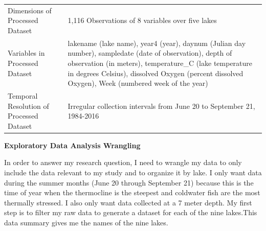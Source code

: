 \documentclass[12pt,]{article}
\begin{document}
\begin{longtable}[]{@{}ll@{}}
\begin{minipage}[t]{0.33\columnwidth}
Dimensions of Processed Dataset\strut
\end{minipage} & \begin{minipage}[t]{0.61\columnwidth}\raggedright\strut
1,116 Observations of 8 variables over five lakes\strut
\end{minipage}\tabularnewline
\begin{minipage}[t]{0.33\columnwidth}\raggedright\strut
Variables in Processed Dataset\strut
\end{minipage} & \begin{minipage}[t]{0.61\columnwidth}\raggedright\strut
lakename (lake name), year4 (year), daynum (Julian day number),
sampledate (date of observation), depth of observation (in meters),
temperature\_C (lake temperature in degrees Celsius), dissolved Oxygen
(percent dissolved Oxygen), Week (numbered week of the year)\strut
\end{minipage}\tabularnewline
\begin{minipage}[t]{0.33\columnwidth}\raggedright\strut
Temporal Resolution of Processed Dataset\strut
\end{minipage} & \begin{minipage}[t]{0.61\columnwidth}\raggedright\strut
Irregular collection intervals from June 20 to September 21,
1984-2016\strut
\end{minipage}\tabularnewline
\bottomrule
\end{longtable}

\newpage  

\textbf{Exploratory Data Analysis Wrangling}

In order to answer my research question, I need to wrangle my data to
only include the data relevant to my study and to organize it by lake. I
only want data during the summer months (June 20 through September 21)
because this is the time of year when the thermocline is the steepest
and coldwater fish are the most thermally stressed. I also only want
data collected at a 7 meter depth. My first step is to filter my raw
data to generate a dataset for each of the nine lakes.This data summary
gives me the names of the nine lakes.
\end{document}
